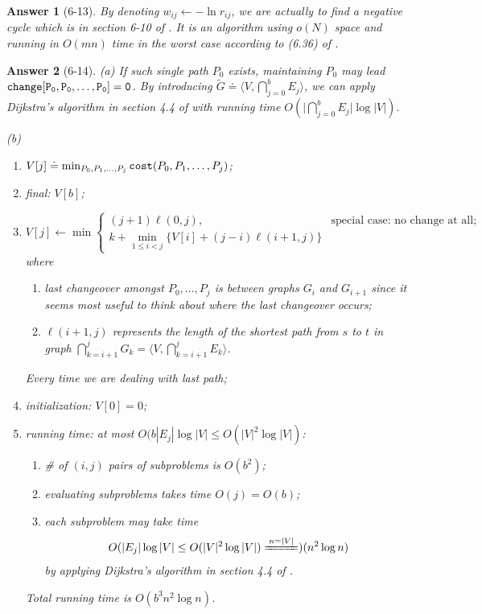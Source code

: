 \documentclass[11pt]{article}
\theoremstyle{numberplain}
\theoremstyle{nonumberplain}
\newtheorem{ans}{Answer}
\newcommand{\dps}{\displaystyle}
\newcommand{\0}{{\mathbf{0}}}
\begin{document}
\begin{ans}[6-13] By denoting $w_{ij}\leftarrow -\ln r_{ij}$, we are actually to find a negative cycle which is in section 6-10 of \cite{jon2005algorithm}. It is an algorithm using $o(N)$ space and running in $O(mn)$ time in the worst case according to (6.36) of \cite{jon2005algorithm}.
\end{ans}
\begin{ans}[6-14](a) If such single path $P_0$ exists, maintaining $P_0$ may lead $\tt{change}[P_0,P_0,\ldots,P_0]=0$. By introducing $\tilde{G}\doteq \langle V,\bigcap_{j=0}^b E_j \rangle$, we can apply Dijkstra's  algorithm in section 4.4 of \cite{jon2005algorithm} with running time $O\left(\big|\bigcap_{j=0}^b E_j\big|\log |V|\right)$.\par
(b)
\begin{enumerate}
\item $V[j]\doteq\min_{P_0,P_1,\ldots,P_j}{\tt cost}(P_0,P_1,\ldots,P_j)$;
\item final: $V[b]$;
\item $$V[j]\leftarrow \min\left\{\begin{array}{cc} (j+1)\ell(0,j),& \text{special case: no 
change at all};\\
\dps k+\min_{1\le i <j } \{V[i] +(j-i)\ell(i+1,j)\}\end{array}\right.$$  
where 
\begin{enumerate}
\item last changeover amongst $P_0,\ldots,P_j$ is between graphs $G_i$ and
$G_{i+1}$ since it seems most useful to think about where the 
last changeover occurs;
\item $\ell(i+1,j)$ represents the 
length of the shortest path from $s$ to $t$ in graph $\bigcap_{k=i+1}^jG_k=\langle V,\bigcap_{k=i+1}^jE_k\rangle$.
\end{enumerate}
Every time we are dealing with last path;
\item initialization: $V[0]=0$;
\item running time: at most $O(b|E_{j}|\log |V|\leq O(|V|^2\log |V|)$:
\begin{enumerate}
\item \# of $(i,j)$ pairs of subproblems is $O(b^2)$;
\item evaluating subproblems takes time $O(j)=O(b)$;
\item each subproblem may take time $$O(|E_{j}|\log |V|\leq O(|V|^2\log |V|)\xlongequal{n=|V|})(n^2\log n)$$ by applying  Dijkstra's  algorithm in section 4.4 of \cite{jon2005algorithm}.
\end{enumerate}
Total running time is $O(b^3n^2\log n)$.
\end{enumerate}
\end{ans}
\end{document}

